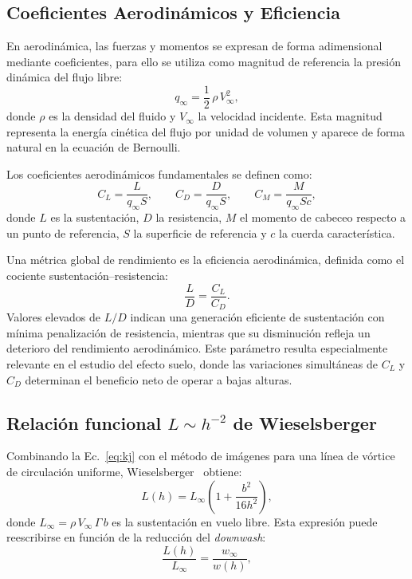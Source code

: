 \documentclass[twocolumn]{article}
\begin{document}
\subsection{Coeficientes Aerodinámicos y Eficiencia}

En aerodinámica, las fuerzas y momentos se expresan de forma
adimensional mediante coeficientes, para ello se utiliza como magnitud de referencia la presión dinámica del flujo libre:
\begin{equation}
  q_\infty = \frac{1}{2}\,\rho\,V_\infty^2,
\end{equation}
donde $\rho$ es la densidad del fluido y $V_\infty$ la velocidad
incidente. Esta magnitud representa la energía cinética del flujo por
unidad de volumen y aparece de forma natural en la ecuación de
Bernoulli.

Los coeficientes aerodinámicos fundamentales se definen como:
\begin{equation}
  C_L = \frac{L}{q_\infty S}, \qquad
  C_D = \frac{D}{q_\infty S}, \qquad
  C_M = \frac{M}{q_\infty S c},
\end{equation}
donde $L$ es la sustentación, $D$ la resistencia, $M$ el momento de
cabeceo respecto a un punto de referencia, $S$ la superficie de referencia y $c$ la cuerda
característica.

Una métrica global de rendimiento es la eficiencia aerodinámica,
definida como el cociente sustentación–resistencia:
\begin{equation}
  \frac{L}{D} = \frac{C_L}{C_D}.
\end{equation}
Valores elevados de $L/D$ indican una generación eficiente de
sustentación con mínima penalización de resistencia, mientras que su
disminución refleja un deterioro del rendimiento aerodinámico. Este
parámetro resulta especialmente relevante en el estudio del efecto
suelo, donde las variaciones simultáneas de $C_L$ y $C_D$ determinan el
beneficio neto de operar a bajas alturas.

\subsection{Relación funcional $L \sim h^{-2}$ de Wieselsberger}

Combinando la Ec.~\eqref{eq:kj} con el método de imágenes para una línea de
vórtice de circulación uniforme, Wieselsberger~\cite{wieselsberger1922} obtiene:
\begin{equation}
  L(h) = L_\infty \left(1 + \frac{b^2}{16h^2}\right),
  \label{eq:wieselsberger}
\end{equation}
donde $L_\infty = \rho\,V_\infty\,\Gamma\,b$ es la sustentación en vuelo libre.
Esta expresión puede reescribirse en función de la reducción del
\textit{downwash}:
\begin{equation}
  \frac{L(h)}{L_\infty} = \frac{w_\infty}{w(h)},
  \label{eq:prop_w}
\end{equation}
\end{document}
